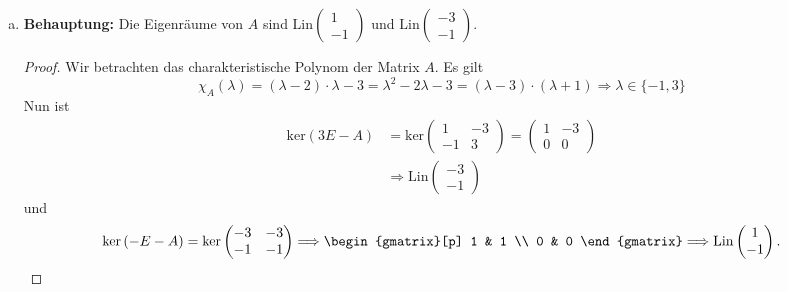 \documentclass{article}
\begin{document}
\begin{enumerate}[(a)]
\begin{proof}
    \begin{align*}
     	f(n+2) &= a_{1,1}f(n+1)+a_{1,2}f(n)\\
     	f(n+1) &= a_{2,1}f(n+1) + a_{2,2}f(n)
     \end{align*}
     Diese ist offensichtlich durch $A$ gegeben.
    	 \end{proof}
     \item \textbf{Behauptung:} Die Eigenräume von $A$ sind $\text{Lin} \left( \begin{matrix} 1 \\ -1 \end{matrix}\right)$ und $\text{Lin}\left(\begin{matrix} -3 \\  -1 \end{matrix}\right)$.
    	\begin{proof}
    		Wir betrachten das charakteristische Polynom der Matrix $A$. Es gilt $$\chi_{A}(\lambda) = (\lambda -2) \cdot \lambda -3 = \lambda^2 -2\lambda -3 = (\lambda-3) \cdot (\lambda +1) \Longrightarrow \lambda \in \{-1,3\} $$
    		Nun ist 
    		\begin{align*}
    		\text{ker}(3E - A) &= \text{ker}\left(\begin{matrix} 1 & -3 \\ -1 & 3 \end{matrix}\right) = \left(\begin{matrix} 1 & -3 \\ 0 & 0 \end{matrix}\right)\\ &\Longrightarrow \text{Lin}\left(\begin{matrix} -3 \\  -1 \end{matrix}\right)
    		\end{align*}
    		und 
    		\begin{align*}
    		\text{ker}\left(-E-A\right) = \ker\left(\begin{matrix} -3 & -3 \\ -1 & -1 \end{matrix}\right) \Longrightarrow \begin{gmatrix}[p] 1 & 1 \\ 0 & 0 \end{gmatrix} \Longrightarrow \text{Lin}\left( \begin{matrix} 1 \\ -1 \end{matrix}\right). 
    		\end{align*}

\end{proof}
\end{enumerate}
\end{document}
